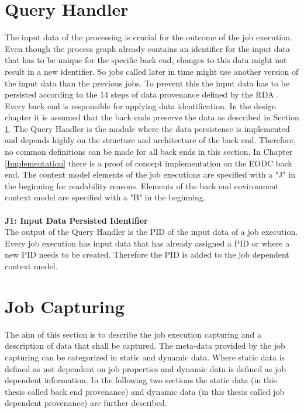 \documentclass[draft,final]{vutinfth} %
\begin{document}
\section{Query Handler}\label{Design:Data Identification}
The input data of the processing is crucial for the outcome of the job execution. Even though the process graph already contains an identifier for the input data that has to be unique for the specific back end, changes to this data might not result in a new identifier. So jobs called later in time might use another version of the input data than the previous jobs. To prevent this the input data has to be persisted according to the 14 steps of data provenance defined by the RDA \cite{rauber2016identification}. Every back end is responsible for applying data identification. In the design chapter it is assumed that the back ends preserve the data as described in Section \ref{Design:Data Identification}. The Query Handler is the module where the data persistence is implemented and depends highly on the structure and architecture of the back end. Therefore, no common definitions can be made for all back ends in this section. In Chapter \ref{Implementation} there is a proof of concept implementation on the EODC back end. The context model elements of the job executions are specified with a "J" in the beginning for readability reasons. Elements of the back end environment context model are specified with a "B" in the beginning. \\
\\
\textbf{J1: Input Data Persisted Identifier} \\
The output of the Query Handler is the PID of the input data of a job execution. Every job execution has input data that has already assigned a PID or where a new PID needs to be created. Therefore the PID is added to the job dependent context model. 

\section{Job Capturing}\label{Design:Job Capturing}
The aim of this section is to describe the job execution capturing and a description of data that shall be captured. The meta-data provided by the job capturing can be categorized in static and dynamic data. Where static data is defined as not dependent on job properties and dynamic data is defined as job dependent information. In the following two sections the static data (in this thesis called back end provenance) and dynamic data (in this thesis called job dependent provenance) are further described.     
\end{document}
